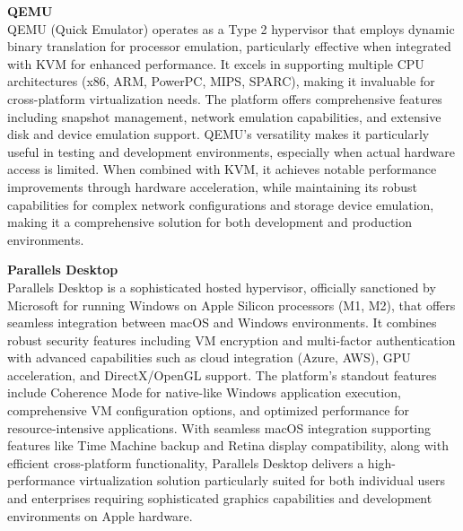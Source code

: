 \documentclass[12pt]{article}
\begin{document}
\begin{spacing}{1.5}
\begin{adjustwidth}{0cm}{0cm}
\begin{justify}
\textbf{QEMU} \\
QEMU (Quick Emulator) operates as a Type 2 hypervisor that employs dynamic binary translation for processor emulation, particularly effective when integrated with KVM for enhanced performance. It excels in supporting multiple CPU architectures (x86, ARM, PowerPC, MIPS, SPARC), making it invaluable for cross-platform virtualization needs. The platform offers comprehensive features including snapshot management, network emulation capabilities, and extensive disk and device emulation support. QEMU's versatility makes it particularly useful in testing and development environments, especially when actual hardware access is limited. When combined with KVM, it achieves notable performance improvements through hardware acceleration, while maintaining its robust capabilities for complex network configurations and storage device emulation, making it a comprehensive solution for both development and production environments.

\textbf{Parallels Desktop} \\
Parallels Desktop is a sophisticated hosted hypervisor, officially sanctioned by Microsoft for running Windows on Apple Silicon processors (M1, M2), that offers seamless integration between macOS and Windows environments. It combines robust security features including VM encryption and multi-factor authentication with advanced capabilities such as cloud integration (Azure, AWS), GPU acceleration, and DirectX/OpenGL support. The platform's standout features include Coherence Mode for native-like Windows application execution, comprehensive VM configuration options, and optimized performance for resource-intensive applications. With seamless macOS integration supporting features like Time Machine backup and Retina display compatibility, along with efficient cross-platform functionality, Parallels Desktop delivers a high-performance virtualization solution particularly suited for both individual users and enterprises requiring sophisticated graphics capabilities and development environments on Apple hardware.


\end{justify}
\end{adjustwidth}
\end{spacing}
\end{document}
